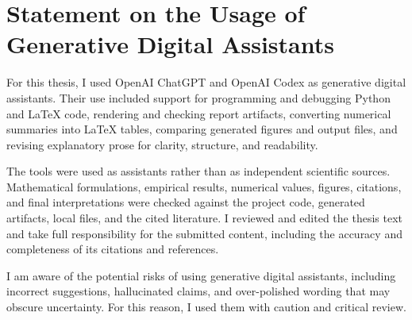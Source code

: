 \documentclass[11pt]{article}
\newcommand{\cleartorecto}{%
  \clearpage
  \ifodd\value{page}
  \else
    \thispagestyle{empty}
    \null
    \clearpage
  \fi
}
\begin{document}
\clearpage
\vspace*{4ex}
\section*{{\Large Statement on the Usage of Generative Digital Assistants}}

For this thesis, I used OpenAI ChatGPT and OpenAI Codex as generative digital assistants. Their use included support for programming and debugging Python and LaTeX code, rendering and checking report artifacts, converting numerical summaries into LaTeX tables, comparing generated figures and output files, and revising explanatory prose for clarity, structure, and readability.

The tools were used as assistants rather than as independent scientific sources. Mathematical formulations, empirical results, numerical values, figures, citations, and final interpretations were checked against the project code, generated artifacts, local files, and the cited literature. I reviewed and edited the thesis text and take full responsibility for the submitted content, including the accuracy and completeness of its citations and references.

I am aware of the potential risks of using generative digital assistants, including incorrect suggestions, hallucinated claims, and over-polished wording that may obscure uncertainty. For this reason, I used them with caution and critical review.

\clearpage
\cleartorecto
{}
{}


\end{document}
